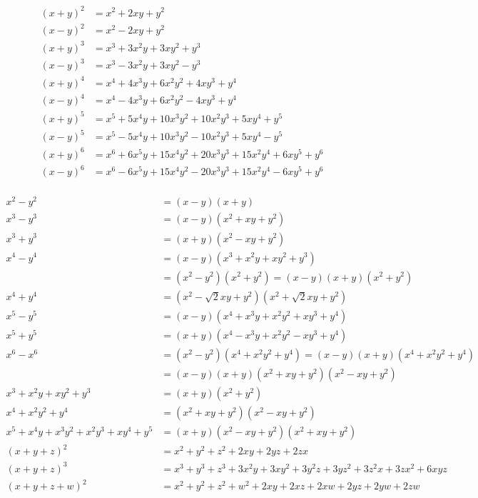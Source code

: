 

\begin{align*}
  (x+y)^{2}&=x^{2}+2xy+y^{2} \\
  (x-y)^{2}&=x^{2}-2xy+y^{2} \\
  (x+y)^{3}&=x^{3}+3x^{2}y+3xy^{2}+y^{3} \\
  (x-y)^{3}&=x^{3}-3x^{2}y+3xy^{2}-y^{3} \\
  (x+y)^{4}&=x^{4}+4x^{3}y+6x^{2}y^{2}+4xy^{3}+y^{4} \\
  (x-y)^{4}&=x^{4}-4x^{3}y+6x^{2}y^{2}-4xy^{3}+y^{4} \\
  (x+y)^{5}&=x^{5}+5x^{4}y+10x^{3}y^{2}+10x^{2}y^{3}+5xy^{4}+y^{5} \\
  (x-y)^{5}&=x^{5}-5x^{4}y+10x^{3}y^{2}-10x^{2}y^{3}+5xy^{4}-y^{5} \\
  (x+y)^{6}&=x^{6}+6x^{5}y+15x^{4}y^{2}+20x^{3}y^{3}+15x^{2}y^{4}+6xy^{5}+y^{6} \\
  (x-y)^{6}&=x^{6}-6x^{5}y+15x^{4}y^{2}-20x^{3}y^{3}+15x^{2}y^{4}-6xy^{5}+y^{6} \\
\end{align*}

\begin{align*}
  x^{2}-y^{2}&=(x-y)(x+y) \\
  x^{3}-y^{3}&=(x-y)(x^{2}+xy+y^{2}) \\
  x^{3}+y^{3}&=(x+y)(x^{2}-xy+y^{2}) \\
  x^{4}-y^{4}&=(x-y)(x^{3}+x^{2}y+xy^{2}+y^{3}) \\
    &=(x^{2}-y^{2})(x^{2}+y^{2})=(x-y)(x+y)(x^{2}+y^{2}) \\
  x^{4}+y^{4}&=(x^{2}-\sqrt{2}xy+y^{2})(x^{2}+\sqrt{2}xy+y^{2}) \\
  x^{5}-y^{5}&=(x-y)(x^{4}+x^{3}y+x^{2}y^{2}+xy^{3}+y^{4}) \\
  x^{5}+y^{5}&=(x+y)(x^{4}-x^{3}y+x^{2}y^{2}-xy^{3}+y^{4}) \\
  x^{6}-x^{6}&=(x^{2}-y^{2})(x^{4}+x^{2}y^{2}+y^{4})=(x-y)(x+y)(x^{4}+x^{2}y^{2}+y^{4}) \\
  &=(x-y)(x+y)(x^{2}+xy+y^{2})(x^{2}-xy+y^{2}) \\
  x^{3}+x^{2}y+xy^{2}+y^{3}&=(x+y)(x^{2}+y^{2}) \\
  x^{4}+x^{2}y^{2}+y^{4}&=(x^{2}+xy+y^{2})(x^{2}-xy+y^{2}) \\
  x^{5}+x^{4}y+x^{3}y^{2}+x^{2}y^{3}+xy^{4}+y^{5}&=(x+y)(x^{2}-xy+y^{2})(x^{2}+xy+y^{2})\\
  (x+y+z)^{2}&=x^{2}+y^{2}+z^{2}+2xy+2yz+2zx \\
  (x+y+z)^{3}&=x^{3}+y^{3}+z^{3}+3x^{2}y+3xy^{2}+3y^{2}z+3yz^{2}+3z^{2}x+3zx^{2}+6xyz \\
  (x+y+z+w)^{2}&=x^{2}+y^{2}+z^{2}+w^{2}+2xy+2xz+2xw+2yz+2yw+2zw\\
\end{align*}



